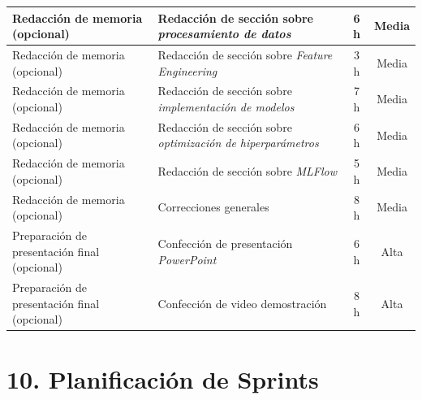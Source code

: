\documentclass[
11pt, %
]{charter}
\begin{document}
\begin{xltabular}{\linewidth}{@{}|X|X|c|c|@{}}
Redacción de memoria (opcional) & Redacción de sección sobre \textit{procesamiento de datos} & 6 h & Media \\ \hline
Redacción de memoria (opcional) & Redacción de sección sobre \textit{Feature Engineering} & 3 h & Media \\ \hline
Redacción de memoria (opcional) & Redacción de sección sobre \textit{implementación de modelos} & 7 h & Media \\ \hline
Redacción de memoria (opcional) & Redacción de sección sobre \textit{optimización de hiperparámetros} & 6 h & Media \\ \hline
Redacción de memoria (opcional) & Redacción de sección sobre \textit{MLFlow} & 5 h & Media \\ \hline
Redacción de memoria (opcional) & Correcciones generales & 8 h & Media \\ \hline
Preparación de presentación final (opcional) & Confección de presentación \textit{PowerPoint} & 6 h & Alta \\ \hline
Preparación de presentación final (opcional) & Confección de video demostración & 8 h & Alta \\ \hline
\end{xltabular}

\section{10. Planificación de Sprints}
\end{document}
